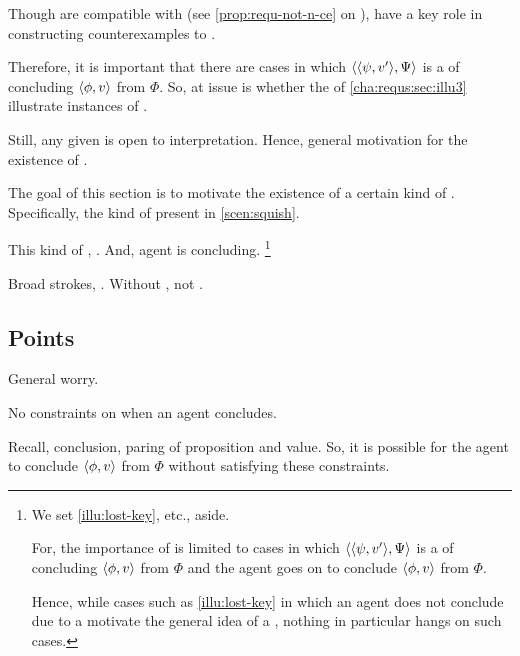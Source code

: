 \begin{note}
  Though  are compatible with \issueConstraint{} (see \autoref{prop:requ-not-n-ce} on ),  have a key role in constructing counterexamples to \issueConstraint{}.

  Therefore, it is important that there are cases in which \(\langle \langle \psi, v' \rangle, \Psi \rangle\) is a  of concluding \(\langle \phi, v \rangle\) from \(\Phi\).
  So, at issue is whether the  of \autoref{cha:requs:sec:illu3} illustrate instances of .

  Still, any given  is open to interpretation.
  Hence, general motivation for the existence of .

  The goal of this section is to motivate the existence of a certain kind of \requ{}.
  Specifically, the kind of  present in \autoref{scen:squish}.

  This kind of \requ{}, \tR{}.
  And, agent is concluding.%
  \footnote{
    We set \autoref{illu:lost-key}, etc., aside.

    For, the importance of  is limited to cases in which \(\langle \langle \psi, v' \rangle, \Psi \rangle\) is a  of concluding \(\langle \phi, v \rangle\) from \(\Phi\) and the agent goes on to conclude \(\langle \phi, v \rangle\) from \(\Phi\).

    Hence, while cases such as \autoref{illu:lost-key} in which an agent does not conclude due to a \requ{} motivate the general idea of a \requ{}, nothing in particular hangs on such cases.
  }
\end{note}

\begin{note}
  Broad strokes, \tR{}.
  Without \requ{}, not \tR{}.
\end{note}

\subsection{Points}

\begin{note}
  General worry.

  No constraints on when an agent concludes.

  Recall, conclusion, paring of proposition and value.
  So, it is possible for the agent to conclude \(\langle \phi, v \rangle\) from \(\Phi\) without satisfying these constraints.
\end{note}

